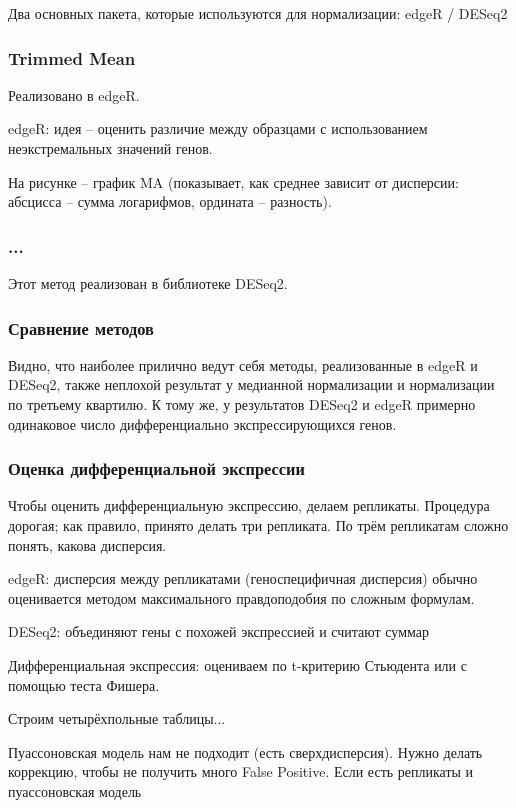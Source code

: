 \documentclass[main.tex]{subfiles}
\begin{document}
Два основных пакета, которые используются для нормализации: edgeR / DESeq2

\subsubsection{Trimmed Mean} %

Реализовано в edgeR.

edgeR: идея -- оценить различие между образцами с использованием неэкстремальных значений генов.

На рисунке -- график MA (показывает, как среднее зависит от дисперсии: абсцисса -- сумма логарифмов, ордината -- разность).

\subsubsection{...} %

Этот метод реализован в библиотеке DESeq2.

\subsubsection{Сравнение методов}

Видно, что наиболее прилично ведут себя методы, реализованные в edgeR и DESeq2, также неплохой результат у медианной нормализации и нормализации по третьему квартилю.
К тому же, у результатов DESeq2 и edgeR примерно одинаковое число дифференциально экспрессирующихся генов.


\subsubsection{Оценка дифференциальной экспрессии}

Чтобы оценить дифференциальную экспрессию, делаем репликаты.
Процедура дорогая; как правило, принято делать три репликата.
По трём репликатам сложно понять, какова дисперсия.

edgeR: дисперсия между репликатами (геноспецифичная дисперсия) обычно оценивается методом максимального правдоподобия по сложным формулам.

DESeq2: объединяют гены с похожей экспрессией и считают суммар

Дифференциальная экспрессия: оцениваем по t-критерию Стьюдента или с помощью теста Фишера.

Строим четырёхпольные таблицы...

Пуассоновская модель нам не подходит (есть сверхдисперсия).
Нужно делать коррекцию, чтобы не получить много False Positive.
Если есть репликаты и пуассоновская модель
\end{document}

